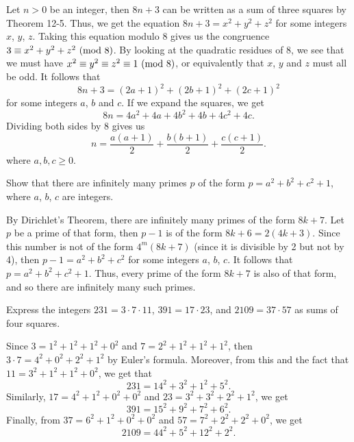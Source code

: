 \begin{solution}
    Let $n > 0$ be an integer, then $8n + 3$ can be written as a sum of three squares by Theorem 12-5. Thus, we get the equation $8n + 3 = x^2 + y^2 + z^2$ for some integers $x$, $y$, $z$. Taking this equation modulo 8 gives us the congruence $3 \equiv x^2 + y^2 + z^2 \ (\mathrm{mod}\ 8)$. By looking at the quadratic residues of 8, we see that we must have $x^2 \equiv y^2 \equiv z^2 \equiv 1 \ (\mathrm{mod}\ 8)$, or equivalently that $x$, $y$ and $z$ must all be odd. It follows that
    $$8n + 3 = (2a + 1)^2 + (2b + 1)^2 + (2c + 1)^2$$
    for some integers $a$, $b$ and $c$. If we expand the squares, we get
    $$8n = 4a^2 + 4a + 4b^2 + 4b + 4c^2 + 4c.$$
    Dividing both sides by 8 gives us
    $$n = \frac{a(a+1)}{2} + \frac{b(b+1)}{2} + \frac{c(c+1)}{2}.$$
    where $a, b, c \geq 0$. \\
\end{solution}

\begin{exercise}
    Show that there are infinitely many primes $p$ of the form $p = a^2 + b^2 + c^2 + 1$, where $a$, $b$, $c$ are integers.  \\
\end{exercise}

\begin{solution}
    By Dirichlet's Theorem, there are infinitely many primes of the form $8k + 7$. Let $p$ be a prime of that form, then $p-1$ is of the form $8k + 6 = 2(4k + 3)$. Since this number is not of the form $4^m(8k + 7)$ (since it is divisible by 2 but not by 4), then $p-1 = a^2 + b^2 + c^2$ for some integers $a$, $b$, $c$. It follows that $p = a^2 + b^2 + c^2 + 1$. Thus, every prime of the form $8k + 7$ is also of that form, and so there are infinitely many such primes. \\
\end{solution}

\begin{exercise}
    Express the integers $231 = 3\cdot 7 \cdot 11$, $391 = 17\cdot 23$, and $2109 = 37 \cdot 57$ as sums of four squares. \\
\end{exercise}

\begin{solution}
    Since $3 = 1^2 + 1^2 + 1^2 + 0^2$ and $7 = 2^2 + 1^2 + 1^2 + 1^2$, then $3\cdot 7 = 4^2 + 0^2 + 2^2 + 1^2$ by Euler's formula. Moreover, from this and the fact that $11 = 3^2 + 1^2 + 1^2 + 0^2$, we get that
    $$231 = 14^2 + 3^2 + 1^2 + 5^2.$$
    Similarly, $17 = 4^2 + 1^2 + 0^2 + 0^2$ and $23 = 3^2 + 3^2 + 2^2 + 1^2$, we get
    $$391 = 15^2 + 9^2 + 7^2 + 6^2.$$
    Finally, from $37 = 6^2 + 1^2 + 0^2 + 0^2$ and $57 = 7^2 + 2^2 + 2^2 + 0^2$, we get
    $$2109 = 44^2 + 5^2 + 12^2 + 2^2.$$ \\
\end{solution}

